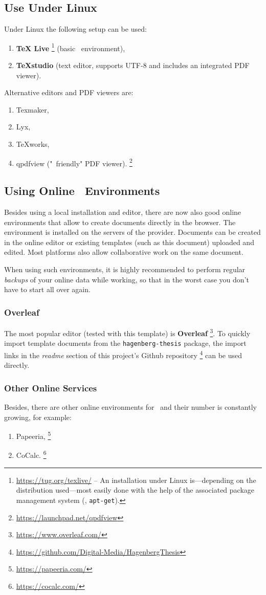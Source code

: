 \subsection{Use Under Linux}

Under Linux the following setup can be used:
%
\begin{enumerate}
	\item 
	\textbf{TeX Live}%
	\footnote{\url{https://tug.org/texlive/} -- An installation under Linux is---depending
	on the distribution used---most easily done with the help of the associated package
	management system (\eg, \texttt{apt-get}).}
	(basic \latex\ environment),
	\item \textbf{TeXstudio} (text editor, supports UTF-8 and includes an
	integrated PDF viewer).
\end{enumerate}
%
Alternative editors and PDF viewers are:
%
\begin{enumerate}
	\item Texmaker,%
	\item Lyx,%
	\item TeXworks,%
	\item qpdfview ("\latex\ friendly" PDF viewer).%
	\footnote{\url{https://launchpad.net/qpdfview}}
\end{enumerate}


\subsection{Using Online \latex\ Environments}

Besides using a local \latex installation and editor, there are now also good online 
environments that allow to create \latex documents directly in the browser.
The \latex environment is installed on the servers of the provider. Documents can be
created in the online editor or existing templates (such as this document) uploaded and 
edited. Most platforms also allow collaborative work on the same document.

When using such environments, it is highly recommended to perform regular \emph{backups} of your
online data while working, so that in the worst case you don't have to start all over 
again.

\subsubsection{Overleaf}

The most popular editor (tested with this template) is \textbf{Overleaf}%
\footnote{\url{https://www.overleaf.com/}}.
To quickly import template documents from the \texttt{hagenberg-thesis} package, the 
import links in the \emph{readme} section of this project's Github repository%
\footnote{\url{https://github.com/Digital-Media/HagenbergThesis}}
can be used directly.


\subsubsection{Other Online Services}

Besides, there are other online environments for \latex\ and their number is constantly growing, for example:
%
\begin{enumerate}
	\item Papeeria,%
	\footnote{\url{https://papeeria.com/}}
	\item CoCalc.%
	\footnote{\url{https://cocalc.com/}}
\end{enumerate}
